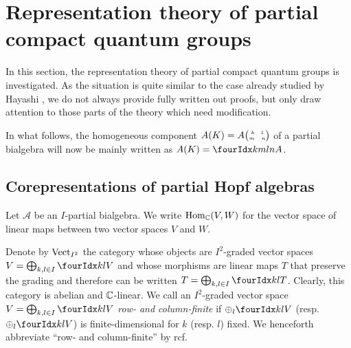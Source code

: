 
\section{Representation theory of partial compact quantum groups}

In this section, the representation theory of partial compact quantum groups is investigated. As the situation is quite similar to the case already studied by Hayashi \cite{Hay1}, we do not always provide fully written out proofs, but only draw attention to those parts of the theory which need modification.

In what follows, the homogeneous component $A(K) = A{{\tiny \begin{pmatrix} k \quad l \\ m \quad n\end{pmatrix}}}$ of a partial bialgebra will now be mainly written as $A(K) = \Gr{A}{k}{l}{m}{n}$. 

\subsection{Corepresentations of partial Hopf algebras}


Let $\mathscr{A}$ be an $I$-partial bialgebra. We write
$\operatorname{Hom}_{\mathbb{C}}(V,W)$ for the vector space of linear maps between two vector
spaces $V$ and $W$.



Denote by $\mathrm{Vect}_{I^{2}}$ the category whose objects are $I^{2}$-graded
vector spaces $V=\bigoplus_{k,l\in I} \Gru{V}{k}{l}$ and whose
morphisms are linear maps $T$ that preserve the grading and therefore
can be written $T=\bigoplus_{k,l\in I} \Gru{T}{k}{l}$.  Clearly, this
category is abelian and $\mathbb{C}$-linear.  We call an $I^{2}$-graded vector
space $V=\bigoplus_{k,l\in I} \Gru{V}{k}{l}$ \emph{row- and
  column-finite} if $\oplus_l \Gru{V}{k}{l}$ (resp. $\oplus_l
\Gru{V}{k}{l}$) is finite-dimensional for $k$ (resp. $l$) fixed.
We henceforth abbreviate ``row- and column-finite'' by rcf.

